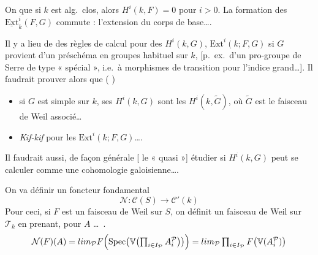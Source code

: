 \documentclass[11pt,a4paper]{article}
\begin{document}
On  que si $k$ est alg.\ clos, alors $H^{i}(k, F) = 0$ pour
$i > 0$. La formation des $\underline{\mathrm{Ext}}^{i}_{k}(F, G)$ commute :
l'extension du corps de base\ldots.

Il y a lieu de   des
règles de calcul pour des $H^{i}(k, G)$, $\mathrm{Ext}^{i}(k; F, G)$ si $G$
provient d'un préschéma en groupes habituel sur $k$,
[p.\ ex.\ d'un pro-groupe de Serre de type « spécial », i.e.\ à morphismes
de transition  pour l'indice grand\ldots].
Il faudrait prouver alors que ( \ill{} )
\begin{itemize}
\item[a)] si $G$ est simple sur $k$, ses $H^{i}(k, G)$ sont les
$H^{i}(k, \tilde{G})$, où $\tilde{G}$ est le faisceau de Weil associé\ldots
\item[b)] \emph{Kif-kif} pour les $\mathrm{Ext}^{i}(k; F, G)$\ldots.
\end{itemize}

Il faudrait aussi, de façon générale [ le 
« quasi »] étudier \struck{\ill{}} si $H^{i}(k, G)$ peut se calculer comme une
cohomologie galoisienne\ldots.


On va définir un foncteur fondamental
\[
\mathcal{N} \colon \mathcal{C}(S) \to \mathcal{C}'(k)
\]
Pour ceci, si $F$ est un  faisceau de Weil sur $S$, on définit
un faisceau de Weil sur $\mathcal{T}_{k}$ en prenant, pour $A$
   
\ldots\ \ill{}.
\[
\mathcal{N}(F)(A) = \varinjlim_{\mathcal{P}} F\Bigl(\operatorname{Spec}\bigl(\mathbb{V}\bigl(\textstyle\prod_{i \in I_{\mathcal{P}}} A^{\mathcal{P}}_{i}\bigr)\bigr)\Bigr)
= \varinjlim_{\mathcal{P}} \prod_{i \in I_{\mathcal{P}}} F\bigl(\mathbb{V}(A^{\mathcal{P}}_{i})\bigr)
\]
\end{document}
